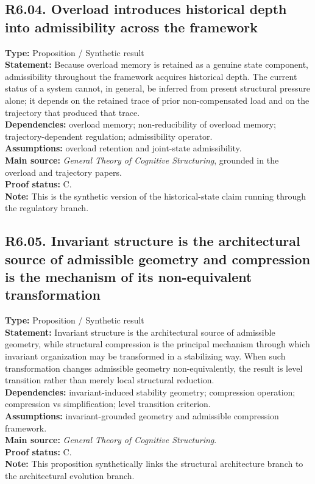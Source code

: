 \documentclass[12pt]{article}
\begin{document}
	\subsection*{R6.04. Overload introduces historical depth into admissibility across the framework}
	\textbf{Type:} Proposition / Synthetic result \\
	\textbf{Statement:} Because overload memory is retained as a genuine state component,
	admissibility throughout the framework acquires historical depth. The current status of a
	system cannot, in general, be inferred from present structural pressure alone; it depends on
	the retained trace of prior non-compensated load and on the trajectory that produced that
	trace. \\
	\textbf{Dependencies:} overload memory; non-reducibility of overload memory; trajectory-dependent
	regulation; admissibility operator. \\
	\textbf{Assumptions:} overload retention and joint-state admissibility. \\
	\textbf{Main source:} \emph{General Theory of Cognitive Structuring}, grounded in the overload
	and trajectory papers. \\
	\textbf{Proof status:} C. \\
	\textbf{Note:} This is the synthetic version of the historical-state claim running through the
	regulatory branch.
	
	\subsection*{R6.05. Invariant structure is the architectural source of admissible geometry and compression is the mechanism of its non-equivalent transformation}
	\textbf{Type:} Proposition / Synthetic result \\
	\textbf{Statement:} Invariant structure is the architectural source of admissible geometry,
	while structural compression is the principal mechanism through which invariant organization may
	be transformed in a stabilizing way. When such transformation changes admissible geometry
	non-equivalently, the result is level transition rather than merely local structural reduction. \\
	\textbf{Dependencies:} invariant-induced stability geometry; compression operation; compression
	vs simplification; level transition criterion. \\
	\textbf{Assumptions:} invariant-grounded geometry and admissible compression framework. \\
	\textbf{Main source:} \emph{General Theory of Cognitive Structuring}. \\
	\textbf{Proof status:} C. \\
	\textbf{Note:} This proposition synthetically links the structural architecture branch to the
	architectural evolution branch.
	
\end{document}
